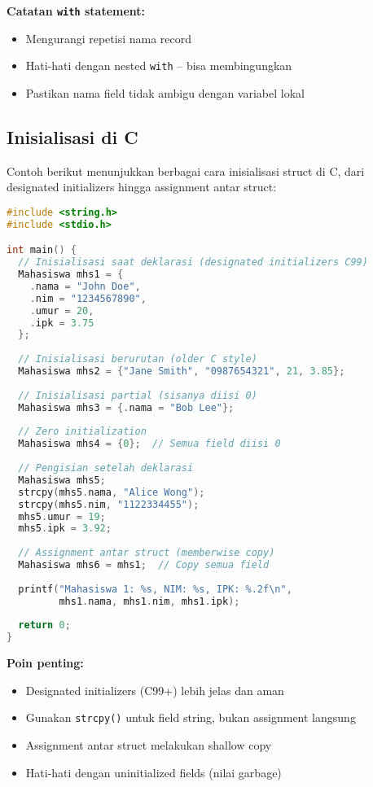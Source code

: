 \documentclass[../main.tex]{subfiles}
\begin{document}
\textbf{Catatan \texttt{with} statement:}
\begin{itemize}
  \item Mengurangi repetisi nama record
  \item Hati-hati dengan nested \texttt{with} -- bisa membingungkan
  \item Pastikan nama field tidak ambigu dengan variabel lokal
\end{itemize}

\subsection{Inisialisasi di C}

Contoh berikut menunjukkan berbagai cara inisialisasi struct di C, dari designated initializers hingga assignment antar struct:

\begin{lstlisting}[language=C, caption={Inisialisasi struct di C}]
#include <string.h>
#include <stdio.h>

int main() {
  // Inisialisasi saat deklarasi (designated initializers C99)
  Mahasiswa mhs1 = {
    .nama = "John Doe",
    .nim = "1234567890",
    .umur = 20,
    .ipk = 3.75
  };
  
  // Inisialisasi berurutan (older C style)
  Mahasiswa mhs2 = {"Jane Smith", "0987654321", 21, 3.85};
  
  // Inisialisasi partial (sisanya diisi 0)
  Mahasiswa mhs3 = {.nama = "Bob Lee"};
  
  // Zero initialization
  Mahasiswa mhs4 = {0};  // Semua field diisi 0
  
  // Pengisian setelah deklarasi
  Mahasiswa mhs5;
  strcpy(mhs5.nama, "Alice Wong");
  strcpy(mhs5.nim, "1122334455");
  mhs5.umur = 19;
  mhs5.ipk = 3.92;
  
  // Assignment antar struct (memberwise copy)
  Mahasiswa mhs6 = mhs1;  // Copy semua field
  
  printf("Mahasiswa 1: %s, NIM: %s, IPK: %.2f\n", 
         mhs1.nama, mhs1.nim, mhs1.ipk);
  
  return 0;
}
\end{lstlisting}

\textbf{Poin penting:}
\begin{itemize}
  \item Designated initializers (C99+) lebih jelas dan aman
  \item Gunakan \texttt{strcpy()} untuk field string, bukan assignment langsung
  \item Assignment antar struct melakukan shallow copy
  \item Hati-hati dengan uninitialized fields (nilai garbage)
\end{itemize}
\end{document}
